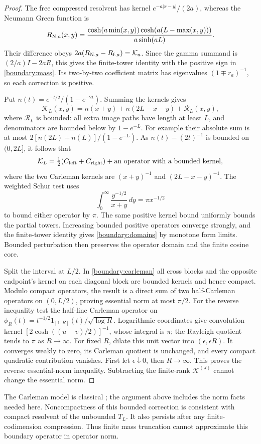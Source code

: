 \begin{proof}
The free compressed resolvent has kernel $e^{-a|x-y|}/(2a)$,
whereas the Neumann Green function is
\[
R_{{\rm N},a}(x,y)=
\frac{\cosh(a\min(x,y))\cosh(a(L-\max(x,y)))}{a\sinh(aL)}.
\]
Their difference obeys
$2a(R_{{\rm N},a}-R_{{\rm f},a})=\mathcal K_a$.
Since the gamma summand is $(2/a)I-2aR$, this gives the finite-tower
identity with the positive sign in \eqref{boundary:mass}.
Its two-by-two coefficient matrix has eigenvalues $(1\mp r_a)^{-1}$,
so each correction is positive.

Put $n(t)=e^{-t/2}/(1-e^{-2t})$. Summing the kernels gives
\[
\mathcal K_L(x,y)=n(x+y)+n(2L-x-y)+\mathcal R_L(x,y),
\]
where $\mathcal R_L$ is bounded: all extra image paths have length
at least $L$, and denominators are bounded below by $1-e^{-L}$.
For example their absolute sum is at most
$2[n(2L)+n(L)]/(1-e^{-L})$.
As $n(t)-(2t)^{-1}$ is bounded on $(0,2L]$, it follows that
\begin{equation}\label{boundary:carleman}
\mathcal K_L=\tfrac12(C_{\rm left}+C_{\rm right})+
\text{an operator with a bounded kernel},
\end{equation}
where the two Carleman kernels are $(x+y)^{-1}$ and
$(2L-x-y)^{-1}$. The weighted Schur test uses
\[
\int_0^\infty\frac{y^{-1/2}}{x+y}\,dy=\pi x^{-1/2}
\]
to bound either operator by $\pi$. The same positive kernel bound
uniformly bounds the partial towers. Increasing bounded positive
operators converge strongly, and the finite-tower identity gives
\eqref{boundary:domains} by monotone form limits. Bounded perturbation
then preserves the operator domain and the finite cosine core.

Split the interval at $L/2$. In \eqref{boundary:carleman} all cross
blocks and the opposite endpoint's kernel on each diagonal block
are bounded kernels and hence compact. Modulo compact operators,
the result is a direct sum of two half-Carleman operators on
$(0,L/2)$, proving essential norm at most $\pi/2$.
For the reverse inequality test the half-line Carleman operator on
$\phi_R(t)=t^{-1/2}1_{[1,R]}(t)/\sqrt{\log R}$.
Logarithmic coordinates give convolution kernel
$[2\cosh((u-v)/2)]^{-1}$, whose integral is $\pi$; the Rayleigh
quotient tends to $\pi$ as $R\to\infty$.
For fixed $R$, dilate this unit vector into
$(\epsilon,\epsilon R)$. It converges weakly to zero, its Carleman
quotient is unchanged, and every compact quadratic contribution
vanishes. First let $\epsilon\downarrow0$, then $R\to\infty$.
This proves the reverse essential-norm inequality. Subtracting the
finite-rank $\mathcal K^{(J)}$ cannot change the essential norm.
\end{proof}
The Carleman model is classical \cite{YafaevCarleman}; the argument
above includes the norm facts needed here. Noncompactness of this
bounded correction is consistent with compact resolvent of the
unbounded $T_L$. It also persists after any finite-codimension
compression. Thus finite mass truncation cannot approximate this
boundary operator in operator norm.

